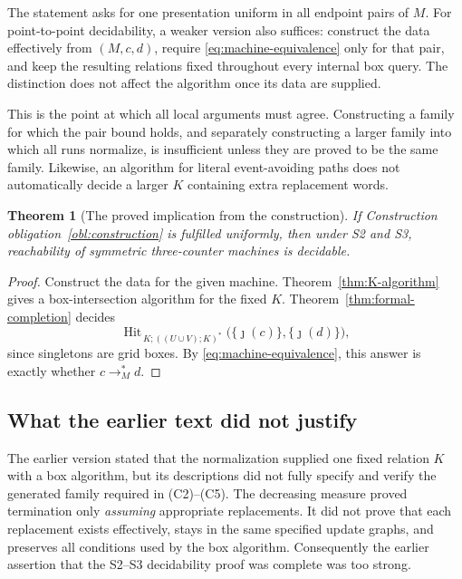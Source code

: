 \documentclass[11pt,a4paper]{article}
\newtheorem{theorem}{Theorem}[section]
\theoremstyle{definition}
\theoremstyle{remark}
\newcommand{\Hit}{\operatorname{Hit}}
\begin{document}
The statement asks for one presentation uniform in all endpoint pairs
of \(M\). For point-to-point decidability, a weaker version also
suffices: construct the data effectively from \((M,c,d)\), require
\eqref{eq:machine-equivalence} only for that pair, and keep the resulting
relations fixed throughout every internal box query. The distinction
does not affect the algorithm once its data are supplied.

This is the point at which all local arguments must agree.
Constructing a family for which the pair bound holds, and separately
constructing a larger family into which all runs normalize, is
insufficient unless they are proved to be the same family.
Likewise, an algorithm for literal event-avoiding paths does not
automatically decide a larger \(K\) containing extra replacement
words.

\begin{theorem}[The proved implication from the construction]
\label{thm:conditional-conclusion}
If Construction obligation~\ref{obl:construction} is fulfilled
uniformly, then under S2 and S3, reachability of symmetric
three-counter machines is decidable.
\end{theorem}
\begin{proof}
Construct the data for the given machine.
Theorem~\ref{thm:K-algorithm} gives a box-intersection algorithm for
the fixed \(K\).
Theorem~\ref{thm:formal-completion} decides
\[
 \Hit_{\,K;((U\cup V);K)^*}
       \bigl(\{\jmath(c)\},\{\jmath(d)\}\bigr),
\]
since singletons are grid boxes.
By \eqref{eq:machine-equivalence}, this answer is exactly whether
\(c\longrightarrow_M^*d\).
\end{proof}

\subsection{What the earlier text did not justify}

The earlier version stated that the normalization supplied one fixed
relation \(K\) with a box algorithm, but its descriptions did not
fully specify and verify the generated family required in
(C2)--(C5). The decreasing measure proved termination only
\emph{assuming} appropriate replacements. It did not prove that each
replacement exists effectively, stays in the same specified update
graphs, and preserves all conditions used by the box algorithm.
Consequently the earlier assertion that the S2--S3 decidability proof
was complete was too strong.
\end{document}
